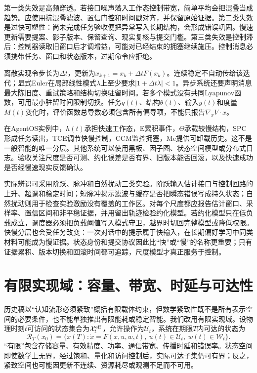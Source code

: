 第一类失效是高频穿透。若接口噪声落入工作态控制带宽，简单平均会把混叠当成趋势。应使用抗混叠滤波、置信门控和时间戳对齐，并保留原始证据。第二类失效是过快可塑性：尚未完成任务验收便把异常写入长期结构，会形成错误巩固。慢速更新需要提案、影子版本、保留查询、现实复核与提交门槛。第三类失效是控制滞后：控制器读取旧窗口后才调增益，可能对已经结束的拥塞继续施压。控制消息必须携带任务、窗口和状态版本，过期命令应拒绝。

离散实现令步长为$\Delta t$，更新为$x_{k+1}=x_k+\Delta tF(x_k)$。连续稳定不自动传给该迭代；显式Euler在局部线性模式$\lambda$上至少要求$|1+\Delta t\lambda|<1$。异步系统还要声明消息最大陈旧度、重试策略和结构切换驻留时间。若多个模式没有共同Lyapunov函数，可用最小驻留时间限制切换。任务$q(t)$、结构$\theta(t)$、输入$y(t)$和度量$M(t)$变化时，评价函数总导数必须包含所有偏导项，不能只报告$\nabla_xV\cdot\dot x$。

在AgentOS实例中，$h(t)$承担快速工作态，E累积事件，$\Theta$承载较慢结构，SPC形成任务读出，TCE调节快慢控制，CCM监控拥塞，Me提供可卸载历史。这不是一般智能的唯一分层。其他系统可以使用黑板、因子图、状态空间模型或分布式日志。验收关注尺度是否可测、约化误差是否有界、旧版本能否回滚，以及快速成功是否经慢速现实反馈确认。

实际辨识可采用阶跃、脉冲和自然扰动三类实验。阶跃输入估计接口与控制回路的上升、超调和稳定时间；短脉冲揭示滤波与缓存是否把瞬态错误写成持久状态；自然扰动则用于检查实验激励没有覆盖的工作区。对每个尺度都应报告估计窗口、采样率、置信区间和非平稳证据，并用留出轨迹检验约化模型。若约化模型只在低负载成立，调度器必须把负载阈值写入模式守卫，越界时切回完整模型或降低权限。快慢分层也会受任务改变：一次对话中的提示属于快输入，在长期偏好学习中同类材料可能成为慢证据。状态身份和提交协议因此比“快”或“慢”的名称更重要；只有证据累积、版本切换和回滚时间都可追踪，尺度模型才真正服务于控制。

\section{有限实现域：容量、带宽、时延与可达性}
\label{sec:compactness_axiom}

历史稿以“认知流形必须紧致”概括有限载体约束，但数学紧致性既不是所有表示空间的必要条件，也不能单独推出有限能耗或稳定智能。我们改用有限实现域。设物理时刻$t$可访问的状态集合为$\mathcal X_t^{\rm eff}$，允许操作为$\mathcal U_t$，系统在期限$T$内可达的状态为
\begin{equation}
\mathcal R_T(x_0)=\{x(T):\dot x=F(x,u,w,t),\ u(t)\in\mathcal U_t,\ w(t)\in\mathcal W_t\}.
\end{equation}
“有限”包含存储容量、有效精度、功率、通信带宽、传播时延和错误率。状态空间即使数学上无界，经过饱和、量化和访问控制后，实际可达子集仍可有界；反之，紧致空间也可能因更新不连续、资源耗尽或观测不足而不可用。

